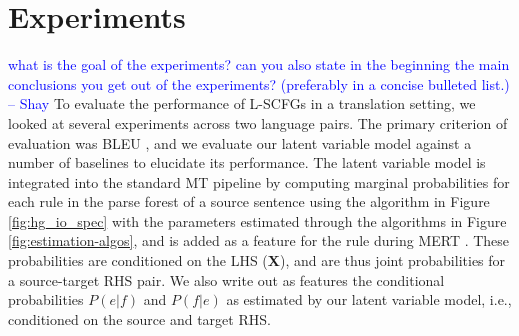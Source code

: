 \documentclass[11pt]{article}
\newcommand{\bX}{{\bf X}}
\newcommand{\shaycomment}[1]{\textcolor{blue}{#1 -- Shay}}
\begin{document}
\section{Experiments}
\label{sec:evaluation}
\shaycomment{what is the goal of the experiments? can you also state in the beginning the main conclusions you get out of the experiments? (preferably in a concise bulleted list.)}
To evaluate the performance of L-SCFGs in a translation setting, we looked at several experiments across two language pairs.  
The primary criterion of evaluation was BLEU \cite{Papineni2002}, and we evaluate our latent variable model against a number of baselines to elucidate its performance.  
The latent variable model is integrated into the standard MT pipeline by computing marginal probabilities for each rule in the parse forest of a source sentence using the algorithm in Figure \ref{fig:hg_io_spec} with the parameters estimated through the algorithms in Figure \ref{fig:estimation-algos}, and is added as a feature for the rule during MERT \cite{Och2003}.  
These probabilities are conditioned on the LHS (\bX), and are thus joint probabilities for a source-target RHS pair.  
We also write out as features the conditional probabilities $P(e|f)$ and $P(f|e)$ as estimated by our latent variable model, i.e., conditioned on the source and target RHS.  
\end{document}
